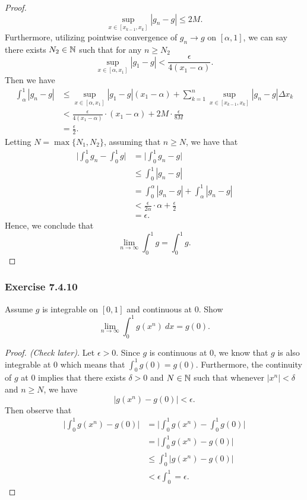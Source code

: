\begin{proof}
\[  \sup_{x \in [x_{k-1}, x_{k }]} | g_{n} - g  | \leq 2M.\] Furthermore, utilizing pointwise convergence of \( g_{n} \to g  \) on \( [\alpha, 1 ] \), we can say there exists \( N_{2} \in \mathbb{N}  \) such that for any \( n \geq N_{2} \)
\[ \sup_{x \in [\alpha, x_{1}]} | g_{1} - g  | < \frac{ \epsilon  }{ 4 (x_{1} - \alpha) } .  \]
Then we have 
\begin{align*}
	\int_{ \alpha }^{ 1 }  | g_{n} -g  |  &\leq \sup_{x \in [\alpha, x_{1}]} | g_{1} - g  | (x_{1} - \alpha) + \sum_{ k=1 }^{ n } \sup_{x\in [x_{k-1},x_{k }]} | g_{n} -g  | \Delta x_{k }  \\
										  &< \frac{ \epsilon  }{ 4 ( x_{1} - \alpha) } \cdot (x_{1} - \alpha) + 2M \cdot \frac{ \epsilon  }{ 8M  } \\ 
										  &= \frac{ \epsilon  }{ 2 }.
\end{align*}
Letting \( N = \max \{ N_{1}, N_{2} \}  \), assuming that \( n \geq N   \), we have that 
\begin{align*}
    \Big| \int_{ 0 }^{ 1 } g_{n} - \int_{ 0 }^{ 1 } g  \Big| &= \Big| \int_{ 0 }^{ 1 } g_{n} - g   \Big|  \\
															 &\leq \int_{ 0 }^{ 1 } | g_{n} - g  |  \\
															 &= \int_{ 0 }^{ \alpha } | g_{n} - g |  + \int_{ \alpha  }^{ 1 }  | g_{n} - g  | \\ 
															 &< \frac{ \epsilon  }{ 2 \alpha } \cdot \alpha + \frac{ \epsilon  }{ 2  } \\
															 &= \epsilon.
\end{align*}
Hence, we conclude that
\[  \lim_{ n \to \infty  }  \int_{ 0 }^{ 1 } g  = \int_{ 0 }^{ 1 } g.  \]
\end{proof}


\subsubsection{Exercise 7.4.10} Assume \( g  \) is integrable on \( [0,1]  \) and continuous at \( 0  \). Show 
\[  \lim_{ n \to \infty  } \int_{ 0 }^{ 1 }  g(x^{n}) \ dx = g(0). \]
\begin{proof}[Proof. (Check later)]
Let \( \epsilon > 0 \). Since \( g \) is continuous at \( 0 \), we know that \( g  \) is also integrable at \( 0  \) which means that \( \int_{ 0 }^{ 1 } g(0) = g(0). \) Furthermore, the continuity of \( g  \) at \( 0 \) implies that there exists \( \delta > 0  \) and \( N \in \mathbb{N}  \) such that whenever \( | x^{n} | < \delta  \) and \( n \geq N  \), we have 
\[  | g(x^{n}) - g(0)  | < \epsilon. \] Then observe that 
\begin{align*}
    \Big| \int_{ 0 }^{ 1 }  g(x^{n}) - g(0)  \Big| &= \Big| \int_{ 0 }^{ 1 } g(x^{n}) - \int_{ 0 }^{ 1 }  g(0) \Big|  \\
												   &=\Big| \int_{ 0 }^{ 1 }  g(x^{n}) - g(0) \Big|  \\
												   &\leq \int_{ 0 }^{ 1 }  | g(x^{n}) - g(0)  | \\
												   &< \epsilon \int_{ 0 }^{ 1 }  = \epsilon.
\end{align*}
\end{proof}



